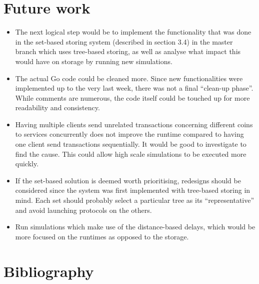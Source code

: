\documentclass[11pt, a4paper, twoside, openright]{article}
\begin{document}
\section{Future work}
\begin{itemize}
\itemsep0em

\item The next logical step would be to implement the functionality that was done in the set-based storing system (described in section 3.4) in the master branch which uses tree-based storing, as well as analyse what impact this would have on storage by running new simulations. 

\item The actual Go code could be cleaned more. Since new functionalities were implemented up to the very last week, there was not a final ``clean-up phase''. While comments are numerous, the code itself could be touched up for more readability and consistency.

\item Having multiple clients send unrelated transactions concerning different coins to services concurrently does not improve the runtime compared to having one client send transactions sequentially. It would be good to investigate to find the cause. This could allow high scale simulations to be executed more quickly.

\item If the set-based solution is deemed worth prioritising, redesigns should be considered since the system was first implemented with tree-based storing in mind. Each set should probably select a particular tree as its ``representative'' and avoid launching protocols on the others.

\item Run simulations which make use of the distance-based delays, which would be more focused on the runtimes as opposed to the storage.

\end{itemize}


\newpage
\section{Bibliography}


\end{document}
